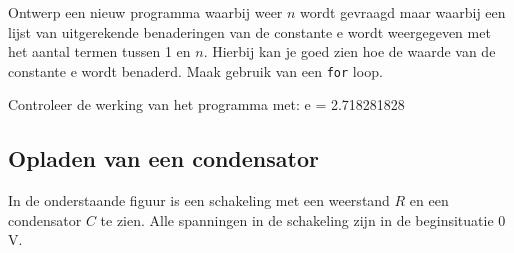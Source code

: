 \documentclass[a4paper,10pt,fleqn,twoside]{article}
\begin{document}
Ontwerp een nieuw programma waarbij weer $n$ wordt gevraagd maar waarbij een lijst van uitgerekende benaderingen van de constante e wordt weergegeven met het aantal termen tussen 1 en $n$. Hierbij kan je goed zien hoe de waarde van de constante e wordt benaderd. Maak gebruik van een \lstinline|for| loop.

Controleer de werking van het programma met: e = 2.718281828



\subsection{Opladen van een condensator}
In de onderstaande figuur is een  schakeling met een weerstand $R$ en een condensator $C$ te zien.
Alle spanningen in de schakeling zijn in de beginsituatie 0 V.

\begin{figure}[H]
\centering
{}
\end{figure}
\end{document}
